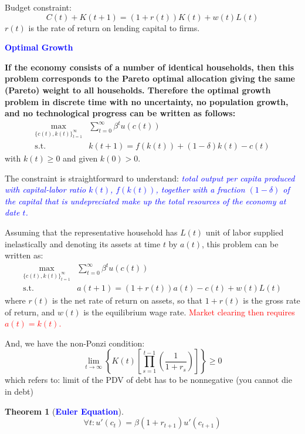 \documentclass{article}
\newtheorem{theorem}{Theorem}
\begin{document}
Budget constraint:
\[ C(t) + K(t + 1) = (1 + r(t))K(t) + w(t)L(t) \]
$r(t)$ is the rate of return on lending capital to firms.

\begin{note}
\textbf{\textcolor{blue}{Optimal Growth}}

\textbf{If the economy consists of a number of identical households, then this problem corresponds to the Pareto optimal allocation giving the same (Pareto) weight to all households. Therefore the optimal growth problem in discrete time with no uncertainty, no population growth, and no technological progress can be written as follows:}
\begin{align*}
    \max_{\{c(t), k(t)\}_{t=1}^{\infty}} &\sum_{t = 0}^{\infty} \beta^t u(c(t)) \\
    \text{s.t.} \quad &k(t + 1) = f(k(t)) + (1 - \delta)k(t) - c(t)
\end{align*}
with $k(t) \geq 0$ and given $k(0) > 0$.

The constraint is straightforward to understand: \textit{\textcolor{blue}{total output per capita produced with capital-labor ratio $k(t)$, $f(k(t))$, together with a fraction $(1 - \delta)$ of the capital that is undepreciated make up the total resources of the economy at date $t$.}}

Assuming that the representative household has $L(t)$ unit of labor supplied inelastically and denoting its assets at time $t$ by $a(t)$, this problem can be written as:
\begin{align*}
    \max_{\{c(t), k(t)\}_{t=1}^{\infty}} &\sum_{t = 0}^{\infty} \beta^t u(c(t)) \\
    \text{s.t.} \quad &a(t + 1) = (1 + r(t))a(t) - c(t) + w(t)L(t)
\end{align*}
where $r(t)$ is the net rate of return on assets, so that $1 + r(t)$ is the gross rate of return, and $w(t)$ is the equilibrium wage rate. \textcolor{red}{Market clearing then requires $a(t) = k(t)$.}
\end{note}

And, we have the non-Ponzi condition:
\[ \lim_{t \to \infty} \left\{K(t)\left[\prod_{s = 1}^{t-1} \left(\frac{1}{1 + r_s}\right)\right]\right\} \geq 0 \]
which refers to: limit of the PDV of debt has to be nonnegative (you cannot die in debt)

\begin{theorem}[\textcolor{blue}{\textbf{Euler Equation}}]
\[ \forall t : u'(c_t) = \beta(1 + r_{t + 1})u'(c_{t + 1}) \]
\end{theorem}
\end{document}
